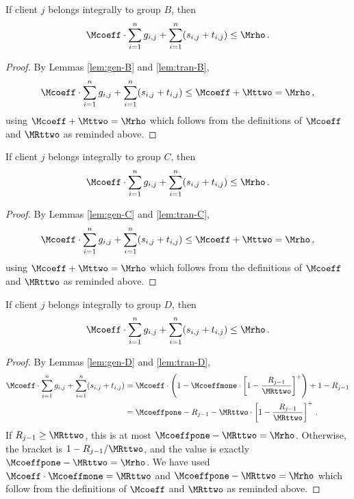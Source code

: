 \begin{lemma}
    \label{lem:budget-B}
    If client $j$ belongs integrally to group $B$, then
    \begin{equation*}
        \Mcoeff \cdot \sum_{i=1}^n g_{i,j} + \sum_{i=1}^n (s_{i,j} + t_{i,j}) \leq \Mrho\,.
    \end{equation*}
\end{lemma}
\begin{proof}
    By Lemmas \ref{lem:gen-B} and \ref{lem:tran-B},
    \begin{equation*}
        \Mcoeff \cdot \sum_{i=1}^n g_{i,j} + \sum_{i=1}^n (s_{i,j} + t_{i,j}) \le \Mcoeff + \Mttwo = \Mrho\,,
    \end{equation*}
    using $\Mcoeff + \Mttwo = \Mrho$ which follows from the definitions of $\Mcoeff$ and $\MRttwo$ as reminded above.
\end{proof}

\begin{lemma}
    \label{lem:budget-C}
    If client $j$ belongs integrally to group $C$, then
    \begin{equation*}
        \Mcoeff \cdot \sum_{i=1}^n g_{i,j} + \sum_{i=1}^n (s_{i,j} + t_{i,j}) \leq \Mrho\,.
    \end{equation*}
\end{lemma}
\begin{proof}
    By Lemmas \ref{lem:gen-C} and \ref{lem:tran-C},
    \begin{equation*}
        \Mcoeff \cdot \sum_{i=1}^n g_{i,j} + \sum_{i=1}^n (s_{i,j} + t_{i,j}) \le \Mcoeff + \Mttwo = \Mrho\,,
    \end{equation*}
    using $\Mcoeff + \Mttwo = \Mrho$ which follows from the definitions of $\Mcoeff$ and $\MRttwo$ as reminded above.
\end{proof}

\begin{lemma}
    \label{lem:budget-D}
    If client $j$ belongs integrally to group $D$, then
    \begin{equation*}
        \Mcoeff \cdot \sum_{i=1}^n g_{i,j} + \sum_{i=1}^n (s_{i,j} + t_{i,j}) \leq \Mrho\,.
    \end{equation*}
\end{lemma}
\begin{proof}
    By Lemmas \ref{lem:gen-D} and \ref{lem:tran-D},
    \begin{align*}
        \Mcoeff \cdot \sum_{i=1}^n g_{i,j} + \sum_{i=1}^n (s_{i,j} + t_{i,j})
        &= \Mcoeff \cdot \left(1 - \Mcoeffmone \cdot \left[1 - \frac{R_{j-1}}{\MRttwo}\right]^+\right) + 1 - R_{j-1} \\
        &= \Mcoeffpone - R_{j-1} - \MRttwo \cdot \left[1 - \frac{R_{j-1}}{\MRttwo}\right]^+\,.
    \end{align*}
    If $R_{j-1} \ge \MRttwo$, this is at most $\Mcoeffpone-\MRttwo = \Mrho$.
    Otherwise, the bracket is $1-R_{j-1}/\MRttwo$, and the value is exactly $\Mcoeffpone-\MRttwo = \Mrho$.
    We have used $\Mcoeff \cdot \Mcoeffmone = \MRttwo$ and $\Mcoeffpone - \MRttwo = \Mrho$ which follow from the definitions of $\Mcoeff$ and $\MRttwo$ as reminded above.
\end{proof}

